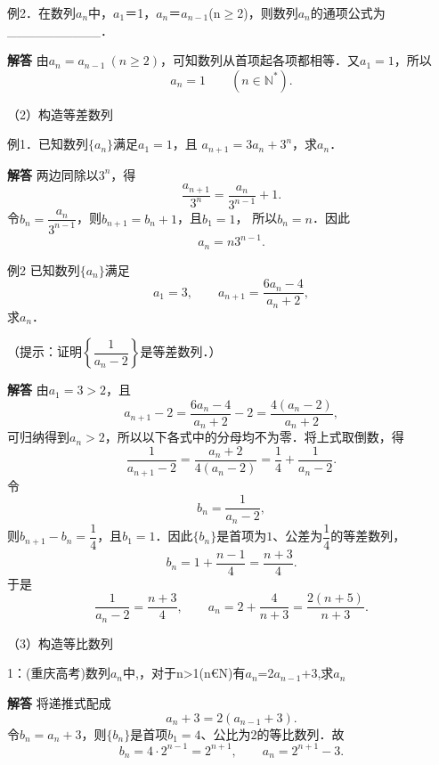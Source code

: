 \qquad{}例2．在数列{\ensuremath{a_{n}}}中，\ensuremath{a_{1}}＝1，\ensuremath{a_{n}}＝\ensuremath{a_{n-1}}(n\ensuremath{\ge}2)，则数列{\ensuremath{a_{n}}}的通项公式为\_\_\_\_\_\_\_\_\_\_．\par
\QuestionSpace{2.5cm}
\ifshowanswers
\par\begingroup\color{solutioncolor}\noindent\textbf{解答}\quad
由$a_n=a_{n-1}\ (n\ge2)$，可知数列从首项起各项都相等．又$a_1=1$，所以
\[
\boxed{a_n=1}\qquad(n\in\mathbb N^*).
\]
\par\endgroup\fi

\par\medskip{}\par
（2）构造等差数列\par
{}
例1．已知数列$\{a_n\}$满足$a_1=1$，且
$a_{n+1}=3a_n+3^n$，求$a_n$．\par
\QuestionSpace{2.5cm}
\ifshowanswers
\par\begingroup\color{solutioncolor}\noindent\textbf{解答}\quad
两边同除以$3^n$，得
\[
\frac{a_{n+1}}{3^n}=\frac{a_n}{3^{n-1}}+1.
\]
令$b_n=\dfrac{a_n}{3^{n-1}}$，则$b_{n+1}=b_n+1$，且$b_1=1$，
所以$b_n=n$．因此
\[
\boxed{a_n=n3^{n-1}}.
\]
\par\endgroup\fi
{}
例2 已知数列$\{a_n\}$满足
\[
a_1=3,\qquad a_{n+1}=\frac{6a_n-4}{a_n+2},
\]
求$a_n$．\par
（提示：证明$\left\{\dfrac1{a_n-2}\right\}$是等差数列．）\par
\QuestionSpace{3.5cm}
\ifshowanswers
\par\begingroup\color{solutioncolor}\noindent\textbf{解答}\quad
由$a_1=3>2$，且
\[
a_{n+1}-2
=\frac{6a_n-4}{a_n+2}-2
=\frac{4(a_n-2)}{a_n+2},
\]
可归纳得到$a_n>2$，所以以下各式中的分母均不为零．将上式取倒数，得
\[
\frac1{a_{n+1}-2}
=\frac{a_n+2}{4(a_n-2)}
=\frac14+\frac1{a_n-2}.
\]
令
\[
b_n=\frac1{a_n-2},
\]
则$b_{n+1}-b_n=\dfrac14$，且$b_1=1$．因此$\{b_n\}$是首项为$1$、公差为$\dfrac14$的等差数列，
\[
b_n=1+\frac{n-1}{4}=\frac{n+3}{4}.
\]
于是
\[
\frac1{a_n-2}=\frac{n+3}{4},
\qquad
\boxed{a_n=2+\frac4{n+3}=\frac{2(n+5)}{n+3}}.
\]
\par\endgroup\fi
（3）构造等比数列\par
1：(重庆高考)数列{\ensuremath{a_{n}}}中,，对于n>1(n€N)有\ensuremath{a_{n}}=2\ensuremath{a_{n-1}}+3,求\ensuremath{a_{n}}\par
\QuestionSpace{3.5cm}
\ifshowanswers
\par\begingroup\color{solutioncolor}\noindent\textbf{解答}\quad
将递推式配成
\[
a_n+3=2(a_{n-1}+3).
\]
令$b_n=a_n+3$，则$\{b_n\}$是首项$b_1=4$、公比为$2$的等比数列．故
\[
b_n=4\cdot2^{n-1}=2^{n+1},
\qquad
\boxed{a_n=2^{n+1}-3}.
\]
\par\endgroup\fi

